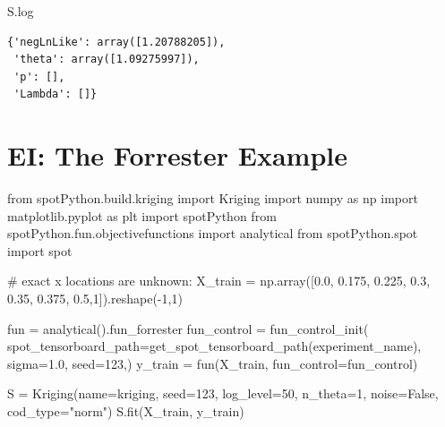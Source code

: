 \documentclass[
  letterpaper,
  DIV=11,
  numbers=noendperiod]{scrreprt}
\newenvironment{Shaded}{\begin{snugshade}}{\end{snugshade}}
\newcommand{\CommentTok}[1]{\textcolor[rgb]{0.37,0.37,0.37}{#1}}
\newcommand{\DecValTok}[1]{\textcolor[rgb]{0.68,0.00,0.00}{#1}}
\newcommand{\FloatTok}[1]{\textcolor[rgb]{0.68,0.00,0.00}{#1}}
\newcommand{\ImportTok}[1]{\textcolor[rgb]{0.00,0.46,0.62}{#1}}
\newcommand{\NormalTok}[1]{\textcolor[rgb]{0.00,0.23,0.31}{#1}}
\newcommand{\OperatorTok}[1]{\textcolor[rgb]{0.37,0.37,0.37}{#1}}
\newcommand{\StringTok}[1]{\textcolor[rgb]{0.13,0.47,0.30}{#1}}
\newcommand{\VariableTok}[1]{\textcolor[rgb]{0.07,0.07,0.07}{#1}}
\begin{document}
\begin{Shaded}
\begin{Highlighting}[]
\NormalTok{S.log}
\end{Highlighting}
\end{Shaded}

\begin{verbatim}
{'negLnLike': array([1.20788205]),
 'theta': array([1.09275997]),
 'p': [],
 'Lambda': []}
\end{verbatim}

\hypertarget{ei-the-forrester-example}{%
\section{EI: The Forrester Example}\label{ei-the-forrester-example}}

\begin{Shaded}
\begin{Highlighting}[]
\ImportTok{from}\NormalTok{ spotPython.build.kriging }\ImportTok{import}\NormalTok{ Kriging}
\ImportTok{import}\NormalTok{ numpy }\ImportTok{as}\NormalTok{ np}
\ImportTok{import}\NormalTok{ matplotlib.pyplot }\ImportTok{as}\NormalTok{ plt}
\ImportTok{import}\NormalTok{ spotPython}
\ImportTok{from}\NormalTok{ spotPython.fun.objectivefunctions }\ImportTok{import}\NormalTok{ analytical}
\ImportTok{from}\NormalTok{ spotPython.spot }\ImportTok{import}\NormalTok{ spot}

\CommentTok{\# exact x locations are unknown:}
\NormalTok{X\_train }\OperatorTok{=}\NormalTok{ np.array([}\FloatTok{0.0}\NormalTok{, }\FloatTok{0.175}\NormalTok{, }\FloatTok{0.225}\NormalTok{, }\FloatTok{0.3}\NormalTok{, }\FloatTok{0.35}\NormalTok{, }\FloatTok{0.375}\NormalTok{, }\FloatTok{0.5}\NormalTok{,}\DecValTok{1}\NormalTok{]).reshape(}\OperatorTok{{-}}\DecValTok{1}\NormalTok{,}\DecValTok{1}\NormalTok{)}

\NormalTok{fun }\OperatorTok{=}\NormalTok{ analytical().fun\_forrester}
\NormalTok{fun\_control }\OperatorTok{=}\NormalTok{ fun\_control\_init(}
\NormalTok{    spot\_tensorboard\_path}\OperatorTok{=}\NormalTok{get\_spot\_tensorboard\_path(experiment\_name),}
\NormalTok{    sigma}\OperatorTok{=}\FloatTok{1.0}\NormalTok{,}
\NormalTok{    seed}\OperatorTok{=}\DecValTok{123}\NormalTok{,)}
\NormalTok{y\_train }\OperatorTok{=}\NormalTok{ fun(X\_train, fun\_control}\OperatorTok{=}\NormalTok{fun\_control)}

\NormalTok{S }\OperatorTok{=}\NormalTok{ Kriging(name}\OperatorTok{=}\StringTok{\textquotesingle{}kriging\textquotesingle{}}\NormalTok{,  seed}\OperatorTok{=}\DecValTok{123}\NormalTok{, log\_level}\OperatorTok{=}\DecValTok{50}\NormalTok{, n\_theta}\OperatorTok{=}\DecValTok{1}\NormalTok{, noise}\OperatorTok{=}\VariableTok{False}\NormalTok{, cod\_type}\OperatorTok{=}\StringTok{"norm"}\NormalTok{)}
\NormalTok{S.fit(X\_train, y\_train)}


\end{Highlighting}
\end{Shaded}
\end{document}
